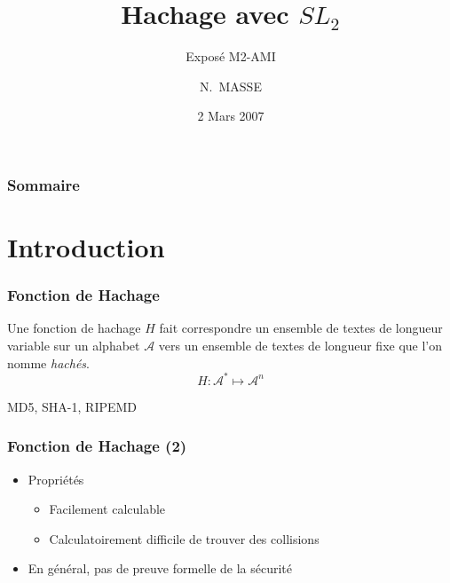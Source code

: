\documentclass{beamer}
\title{Hachage avec $SL_2$}
\subtitle{Exposé M2-AMI}
\author{N.~MASSE}
\institute
{
  M2-AMI\\
  Université de CAEN
}
\date{2 Mars 2007}
\newcommand{\A}{\mathcal{A}}
\begin{document}
\begin{frame}
  \titlepage
\end{frame}

\begin{frame}
  \frametitle{Sommaire}
  \tableofcontents
\end{frame}





\section{Introduction}

\begin{frame}
 \frametitle{Fonction de Hachage}
 \begin{definition}
  Une fonction de hachage $H$ fait correspondre un ensemble de textes de longueur variable sur un alphabet $\A$ vers un 
  ensemble de textes de longueur fixe que l'on nomme \textit{hachés}.
   $$ H:\A^* \longmapsto \A^n $$ 
 \end{definition}

 \begin{example}
  MD5, SHA-1, RIPEMD
 \end{example}
\end{frame}

\begin{frame}
 \frametitle{Fonction de Hachage (2)}
 \begin{itemize}
  \item Propriétés
 \begin{itemize}
  \item Facilement calculable
  \item Calculatoirement difficile de trouver des collisions
 \end{itemize}
 \item En général, pas de preuve formelle de la sécurité 
 \end{itemize}
\end{frame}
\end{document}
